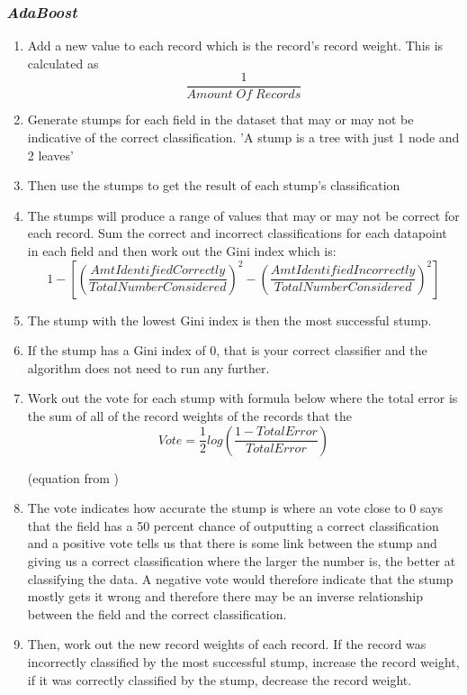 \subsubsection{\textit{AdaBoost}}
\begin{enumerate}
    \item {Add a new value to each record which is the record’s record weight. This is calculated as $$\frac{1}{Amount \; Of \; Records}$$}
    \item {Generate stumps for each field in the dataset that may or may not be indicative of the correct classification. 'A stump is a tree with just 1 node and 2 leaves'\cite{JoshStarmer}}
    \item Then use the stumps to get the result of each stump’s classification
    \item The stumps will produce a range of values that may or may not be correct for each record. Sum the correct and incorrect classifications for each datapoint in each field and then work out the Gini index which is:
    $$1 - \left[\left(\frac{Amt Identified Correctly}{Total Number Considered}\right)^2 - \left(\frac{Amt Identified Incorrectly}{Total Number Considered}\right)^2\right]$$
    \item The stump with the lowest Gini index is then the most successful stump.
    \item If the stump has a Gini index of 0, that is your correct classifier and the algorithm does not need to run any further. 
    \item Work out the vote for each stump with formula below where the total error is the sum of all of the record weights of the records that the $$Vote = \frac{1}{2} log \left( \frac{1-TotalError}{TotalError} \right)$$\caption{(equation from \cite{JoshStarmer})}
    \item The vote indicates how accurate the stump is where an vote close to 0 says that the field has a 50 percent chance of outputting a correct classification and a positive vote tells us that there is some link between the stump and giving us a correct classification where the larger the number is, the better at classifying the data. A negative vote would therefore indicate that the stump mostly gets it wrong and therefore there may be an inverse relationship between the field and the correct classification.
    \item Then, work out the new record weights of each record. If the record was incorrectly classified by the most successful stump, increase the record weight, if it was correctly classified by the stump, decrease the record weight.

\end{enumerate}
